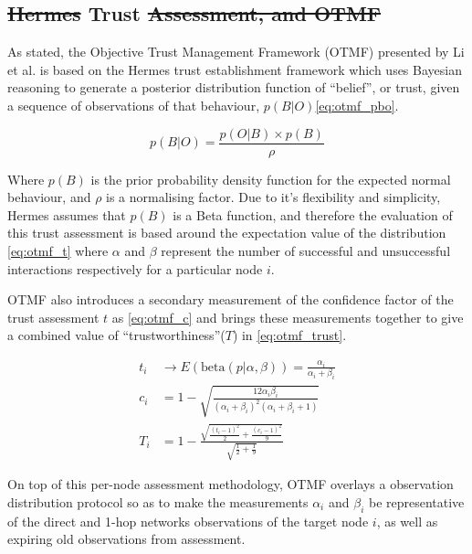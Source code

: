 \documentclass[conference]{IEEEtran}
\providecommand{\DIFadd}[1]{{\protect\color{blue}\uwave{#1}}} %
\providecommand{\DIFdel}[1]{{\protect\color{red}\sout{#1}}}                      %
\providecommand{\DIFaddbegin}{} %
\providecommand{\DIFaddend}{} %
\providecommand{\DIFdelbegin}{} %
\providecommand{\DIFdelend}{} %
\begin{document}
\subsection{\DIFdelbegin \DIFdel{Hermes }\DIFdelend \DIFaddbegin \DIFadd{Single Metric }\DIFaddend Trust \DIFdelbegin \DIFdel{Assessment, and OTMF}\DIFdelend \DIFaddbegin \DIFadd{Frameworks}\DIFaddend }

As stated, the Objective Trust Management Framework (OTMF) presented by Li et al.\cite{Li2008} is based on the Hermes trust establishment framework\cite{Zouridaki2005} which uses Bayesian reasoning to generate a posterior distribution function of ``belief'', or trust, given a sequence of observations of that behaviour, $p(B|O)$\eqref{eq:otmf_pbo}.

\begin{equation}
  p(B|O)  = \frac{p(O|B) \times p(B)}{\rho}
  \label{eq:otmf_pbo}
\end{equation}

Where $p(B)$ is the prior probability density function for the expected normal behaviour, and $\rho$ is a normalising factor.
Due to it's flexibility and simplicity, Hermes assumes that $p(B)$ is a Beta function, and therefore the evaluation of this trust assessment is based around the expectation value of the distribution \eqref{eq:otmf_t}  where $\alpha$ and $\beta$ represent the number of successful and unsuccessful interactions respectively for a particular node $i$.

OTMF also introduces a secondary measurement of the confidence factor of the trust assessment $t$ as \eqref{eq:otmf_c} and brings these measurements together to give a combined value of ``trustworthiness''($T$) in \eqref{eq:otmf_trust}.

\begin{align}
  t_i &\to E(\text{beta}(p|\alpha,\beta)) = \frac{\alpha_i}{\alpha_i+\beta_i} \label{eq:otmf_t}\\
  c_i &= 1 - \sqrt{\frac{12\alpha_i\beta_i}{(\alpha_i+\beta_i)^2(\alpha_i+\beta_i+1)}} \label{eq:otmf_c}\\
  T_i &= 1 - \frac{\sqrt{\frac{(t_i-1)^2}{2} + \frac{(c_i-1)^2}{9}}}{\sqrt{\frac{1}{2}+\frac{1}{9}}} \label{eq:otmf_trust}
\end{align}\DIFaddbegin {}

\DIFaddend 

On top of this per-node assessment methodology, OTMF overlays a observation distribution protocol so as to make the measurements $\alpha_i$ and $\beta_i$ be representative of the direct and 1-hop networks observations of the target node $i$, as well as expiring old observations from assessment.
\end{document}
